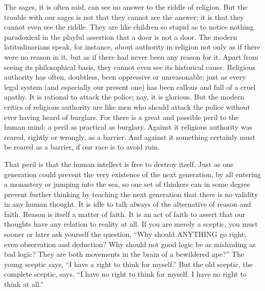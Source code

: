 The sages, it is often said, can see no answer to the riddle of religion. But the trouble with our sages is not that they cannot see the answer; it is that they cannot even see the riddle. They are like children so stupid as to notice nothing paradoxical in the playful assertion that a door is not a door. The modern latitudinarians speak, for instance, about authority in religion not only as if there were no reason in it, but as if there had never been any reason for it. Apart from seeing its philosophical basis, they cannot even see its historical cause. Religious authority has often, doubtless, been oppressive or unreasonable; just as every legal system (and especially our present one) has been callous and full of a cruel apathy. It is rational to attack the police; nay, it is glorious. But the modern critics of religious authority are like men who should attack the police without ever having heard of burglars. For there is a great and possible peril to the human mind: a peril as practical as burglary. Against it religious authority was reared, rightly or wrongly, as a barrier. And against it something certainly must be reared as a barrier, if our race is to avoid ruin.

That peril is that the human intellect is free to destroy itself. Just as one generation could prevent the very existence of the next generation, by all entering a monastery or jumping into the sea, so one set of thinkers can in some degree prevent further thinking by teaching the next generation that there is no validity in any human thought. It is idle to talk always of the alternative of reason and faith. Reason is itself a matter of faith. It is an act of faith to assert that our thoughts have any relation to reality at all. If you are merely a sceptic, you must sooner or later ask yourself the question, “Why should ANYTHING go right; even observation and deduction? Why should not good logic be as misleading as bad logic? They are both movements in the brain of a bewildered ape?” The young sceptic says, “I have a right to think for myself.” But the old sceptic, the complete sceptic, says, “I have no right to think for myself. I have no right to think at all.”

